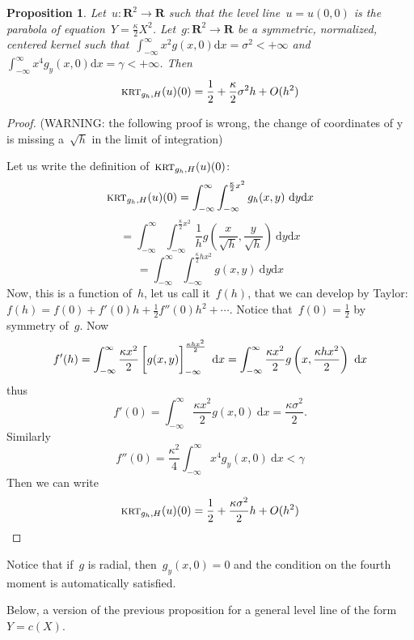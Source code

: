 \documentclass[12pt]{article}                  %
\newtheorem{proposition}{Proposition}
\begin{document}
\clearpage

\begin{proposition}
	Let~$u:\mathbf{R}^2\to\mathbf{R}$ such that the level
	line~$u=u(0,0)$ is the parabola of
	equation~$Y=\displaystyle\frac{\kappa}2X^2$.
	Let~$g:\mathbf{R}^2\to\mathbf{R}$ be a symmetric, normalized,
	centered kernel such that~$\int_{-\infty}^\infty x^2g(x,0)\mathrm{d}
	x=\sigma^2<+\infty$ and~$\int_{-\infty}^\infty x^4g_y(x,0)\mathrm{d}
	x=\gamma<+\infty$.  Then
	\[
		\textsc{krt}_{g_h,H}(u)(0)=\frac12+\frac{\kappa}2\sigma^2h+O(h^2)
	\]
\end{proposition}

\begin{proof}
	(WARNING: the following proof is wrong, the change of coordinates of
	y is missing a~$\sqrt{h}$ in the limit of integration)

	Let us write the definition of~$\textsc{krt}_{g_h,H}(u)(0)$:
	\[
		\textsc{krt}_{g_h,H}(u)(0)=
		\int_{-\infty}^\infty\int_{-\infty}^{\frac{\kappa}2x^2}
		g_h(x,y)\ %
		\mathrm{d}y
		\mathrm{d}x
	\]
	\[
		=
		\int_{-\infty}^\infty\int_{-\infty}^{\frac{\kappa}2x^2}
		\frac1hg\left(\frac{x}{\sqrt{h}},\frac{y}{\sqrt{h}}\right)\ %
		\mathrm{d}y
		\mathrm{d}x
	\]
	\[
		=
		\int_{-\infty}^\infty\int_{-\infty}^{\frac{\kappa}2hx^2}
		g\left(x,y\right)\ %
		\mathrm{d}y
		\mathrm{d}x
	\]
	Now, this is a function of~$h$, let us call it~$f(h)$, that we can
	develop by Taylor:~$f(h)=f(0)+f'(0)h+\frac12f''(0)h^2+\cdots$.
	Notice that~$f(0)=\frac12$ by symmetry of~$g$.  Now
	\[
		f'(h)=
		\int_{-\infty}^\infty \frac{\kappa x^2}2
		\left[\vphantom{\int}g(x,y)\right]_{-\infty}^{\frac{\kappa hx^2}2}
		\ \mathrm{d}x
		=
		\int_{-\infty}^\infty \frac{\kappa x^2}2
		g\left(x,\frac{\kappa h x^2}2\right)
		\ \mathrm{d}x
	\]
	thus
	\[
		f'(0)=
		\int_{-\infty}^\infty \frac{\kappa x^2}2
		g(x,0)\ \mathrm{d}x
		=\frac{\kappa\sigma^2}2.
	\]
	Similarly
	\[
		f''(0)=
		\frac{\kappa^2}4
		\int_{-\infty}^\infty x^4
		g_y(x,0)
		\ \mathrm{d}x
		<\gamma
	\]
	Then we can write
	\[
		\textsc{krt}_{g_h,H}(u)(0)
		=
		\frac12
		+
		\frac{\kappa\sigma^2}2h
		+O(h^2)
	\]
\end{proof}
Notice that if~$g$ is radial, then~$g_y(x,0)=0$ and the condition on the
fourth moment is automatically satisfied.

\clearpage
Below, a version of the previous proposition for a general level line of
the form~$Y=c(X)$.
\end{document}
